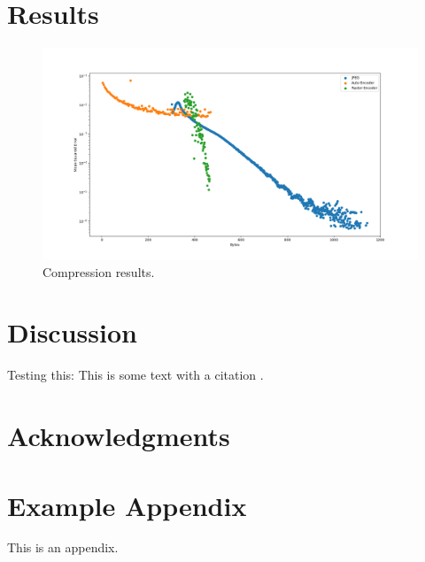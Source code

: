 \documentclass[11pt]{article}
\begin{document}
\section{Results}

\begin{figure}[t]
  \centering
  \includegraphics[width=2\columnwidth]{diagrams/results.png}
  \caption{Compression results.}
  \label{fig:results}
\end{figure}



\section{Discussion}

Testing this: This is some text with a citation \citep{lazaridou-etal-2020-multi}.

\section*{Acknowledgments}



\appendix

\section{Example Appendix}
\label{sec:appendix}

This is an appendix.
\end{document}
